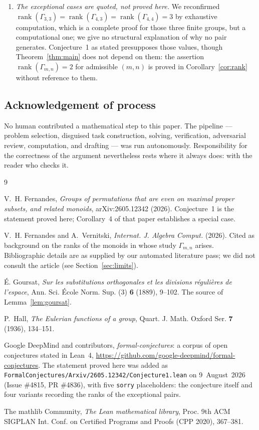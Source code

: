 \documentclass[11pt]{article}
\theoremstyle{plain}
\theoremstyle{definition}
\theoremstyle{remark}
\numberwithin{equation}{section}
\newcommand{\Gam}{\Gamma}
\DeclareMathOperator{\rank}{rank}
\begin{document}
\begin{enumerate}
\item \emph{The exceptional cases are quoted, not proved here.} We reconfirmed
$\rank(\Gam_{3,3}) = \rank(\Gam_{4,3}) = \rank(\Gam_{4,4}) = 3$ by exhaustive computation, which
is a complete proof for those three finite groups, but a computational one; we give no
structural explanation of why no pair generates. Conjecture~1 as stated presupposes those
values, though Theorem~\ref{thm:main} does not depend on them: the assertion
$\rank(\Gam_{m,n}) = 2$ for admissible $(m,n)$ is proved in Corollary~\ref{cor:rank} without
reference to them.
\end{enumerate}

\subsection*{Acknowledgement of process}

No human contributed a mathematical step to this paper. The pipeline --- problem selection,
disguised task construction, solving, verification, adversarial review, computation, and
drafting --- was run autonomously. Responsibility for the correctness of the argument
nevertheless rests where it always does: with the reader who checks it.

\begin{thebibliography}{9}

V.~H. Fernandes,
\emph{Groups of permutations that are even on maximal proper subsets, and related monoids},
arXiv:2605.12342 (2026).
Conjecture~1 is the statement proved here; Corollary~4 of that paper establishes a special case.

V.~H. Fernandes and A.~Vernitski,
\emph{Internat. J. Algebra Comput.} (2026).
Cited as background on the ranks of the monoids in whose study $\Gam_{m,n}$ arises.
Bibliographic details are as supplied by our automated literature pass; we did not consult the
article (see Section~\ref{sec:limits}).

\'E. Goursat,
\emph{Sur les substitutions orthogonales et les divisions r\'eguli\`eres de l'espace},
Ann. Sci. \'Ecole Norm. Sup. (3) \textbf{6} (1889), 9--102.
The source of Lemma~\ref{lem:goursat}.

P.~Hall,
\emph{The Eulerian functions of a group},
Quart. J. Math. Oxford Ser. \textbf{7} (1936), 134--151.

Google DeepMind and contributors,
\emph{formal-conjectures}: a corpus of open conjectures stated in Lean~4,
\url{https://github.com/google-deepmind/formal-conjectures}.
The statement proved here was added as
\texttt{FormalConjectures/Arxiv/2605.12342/Conjecture1.lean} on 9~August~2026
(Issue \#4815, PR \#4836), with five \texttt{sorry} placeholders: the conjecture itself and
four variants recording the ranks of the exceptional pairs.

The mathlib Community,
\emph{The Lean mathematical library},
Proc. 9th ACM SIGPLAN Int. Conf. on Certified Programs and Proofs (CPP 2020), 367--381.

\end{thebibliography}
\end{document}
